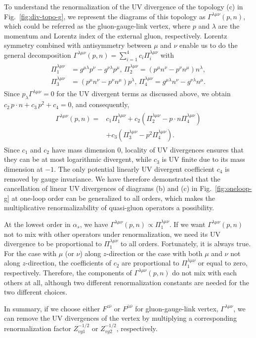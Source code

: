 To understand the renormalization of the UV divergence of the topology (c) in Fig.~\ref{fig:div-topo-g}, we represent the diagrams of this topology as $\Gamma^{\lambda \mu \nu}(p,n)$, which could be referred as the gluon-gauge-link vertex, where $p$ and $\lambda$ are the momentum and Lorentz index of the external gluon, respectively. Lorentz symmetry combined with antisymmetry between $\mu$ and $\nu$ enable us to do the general decomposition $\Gamma^{\lambda \mu \nu}(p,n)=\sum_{i=1}^4 c_i \Pi_i^{\lambda \mu \nu}$ with
\begin{align}
\begin{split}
\Pi_1^{\lambda \mu \nu}&=g^{\mu\lambda} p^\nu-g^{\nu\lambda}p^\mu,\, \Pi_2^{\lambda \mu \nu}=(p^\mu n^\nu-p^\nu n^\mu)n^\lambda,\\
\Pi_3^{\lambda \mu \nu}&=(p^\mu n^\nu-p^\nu n^\mu)p^\lambda, \,\Pi_4^{\lambda \mu \nu}=g^{\mu\lambda} n^\nu-g^{\nu\lambda}n^\mu.
\end{split}
\end{align}
Since $p_\lambda \Gamma^{\lambda \mu \nu}=0$ for the UV divergent terms as discussed above, we obtain $c_2\, p\cdot n + c_3\, p^2 + c_4=0$, and consequently,
\begin{align}
\begin{split}
\Gamma^{\lambda \mu \nu}(p,n)=&c_1 \Pi_1^{\lambda \mu \nu} + c_2 (\Pi_2^{\lambda \mu \nu}-p\cdot n \Pi_4^{\lambda \mu \nu})\\
&+c_3 (\Pi_3^{\lambda \mu \nu}-p^2 \Pi_4^{\lambda \mu \nu}).
\end{split}
\end{align}
Since $c_1$ and $c_2$ have mass dimension $0$, locality of UV divergences ensures that they can be at most logarithmic divergent, while $c_3$ is UV finite due to its mass dimension at $-1$. The only potential linearly UV divergent coefficient $c_4$ is removed by gauge invariance. We have therefore demonstrated that the cancellation of linear UV divergences of diagrams (b) and (c) in Fig.~\ref{fig:oneloop-g} at one-loop order can be generalized to all orders, which makes the multiplicative renormalizability of quasi-gluon operators a possibility.

At the lowest order in $\alpha_s$, we have $\Gamma^{\lambda \mu \nu}(p,n) \propto \Pi_1^{\lambda \mu \nu}$. If we want $\Gamma^{\lambda \mu \nu}(p,n)$ not to mix with other operators under renormalization, we need its UV divergence to be proportional to $\Pi_1^{\lambda \mu \nu}$ to all orders. Fortunately, it is always true. For the case with $\mu$ (or $\nu$) along $z$-direction or the case with both $\mu$ and $\nu$ not along $z$-direction, the coefficients of $c_2$ are proportional to $\Pi_1^{\lambda \mu \nu}$ or equal to zero, respectively. Therefore, the components of $\Gamma^{\lambda \mu \nu}(p,n)$ do not mix with each others at all, although two different renormalization constants are needed for the two different choices.

In summary, if we choose either $F^{z \bar{\nu}}$ or $F^{\bar{\mu} \bar{\nu}}$ for gluon-gauge-link vertex, $\Gamma^{\lambda \mu \nu}$, we can remove the UV divergences of the vertex by multiplying a corresponding renormalization factor $Z_{vg1}^{-1/2}$ or $Z_{vg2}^{-1/2}$, respectively.
